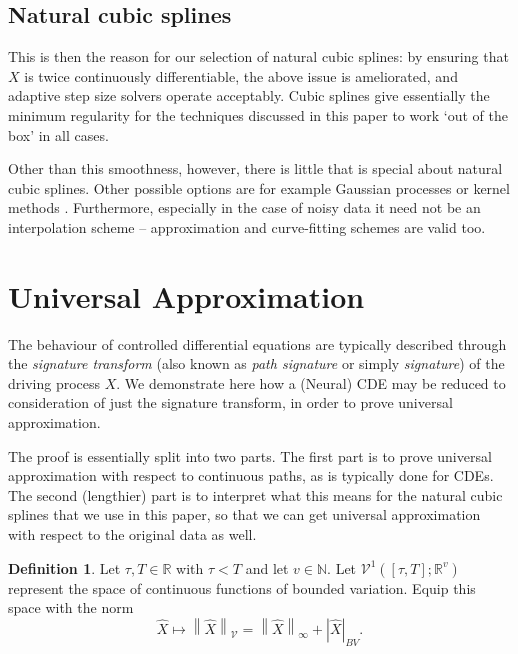 \documentclass{article}
\theoremstyle{plain}
\theoremstyle{definition}
\newtheorem{definition}[thm]{Definition}
\newcommand{\norm}[1]{\left\|#1\right\|}
\newcommand{\abs}[1]{\left|#1\right|}
\newcommand{\reals}{\mathbb{R}}
\newcommand{\naturals}{\mathbb{N}}
\begin{document}
	\subsection{Natural cubic splines}
	This is then the reason for our selection of natural cubic splines: by ensuring that $X$ is twice continuously differentiable, the above issue is ameliorated, and adaptive step size solvers operate acceptably. Cubic splines give essentially the minimum regularity for the techniques discussed in this paper to work `out of the box' in all cases.
	
	Other than this smoothness, however, there is little that is special about natural cubic splines. Other possible options are for example Gaussian processes \cite{gp-adapter1, gp-adapter2} or kernel methods \cite{interpolation-prediction}. Furthermore, especially in the case of noisy data it need not be an interpolation scheme -- approximation and curve-fitting schemes are valid too.
	
	\section{Universal Approximation}\label{appendix:universal}
	The behaviour of controlled differential equations are typically described through the \emph{signature transform} (also known as \emph{path signature} or simply \emph{signature}) \cite{levy-lyons} of the driving process $X$. %
	We demonstrate here how a (Neural) CDE may be reduced to consideration of just the signature transform, in order to prove universal approximation.
	
	The proof is essentially split into two parts. The first part is to prove universal approximation with respect to continuous paths, as is typically done for CDEs. The second (lengthier) part is to interpret what this means for the natural cubic splines that we use in this paper, so that we can get universal approximation with respect to the original data as well.
	
	\begin{definition}
	Let $\tau, T \in \reals$ with $\tau < T$ and let $v \in \naturals$. Let $\mathcal{V}^1([\tau, T]; \reals^v)$ represent the space of continuous functions of bounded variation. Equip this space with the norm
	\begin{equation*}
	\widehat{X} \mapsto \norm{\widehat{X}}_{\mathcal{V}} = \norm{\widehat{X}}_{\infty} + \abs{\widehat{X}}_{BV}.
	\end{equation*}
	\end{definition}
	
\end{document}
